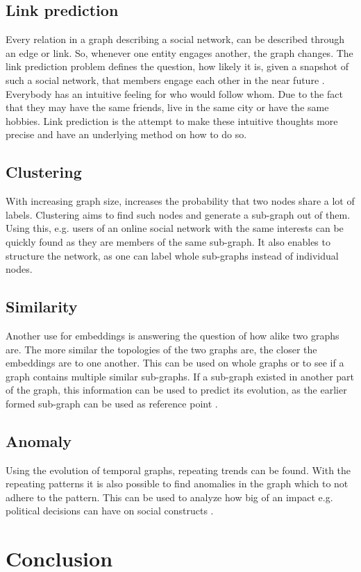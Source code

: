 \documentclass[sigconf]{acmart}
\begin{document}
\subsection{Link prediction}
Every relation in a graph describing a social network, can be described  through an edge or link. So, whenever one entity engages another, the graph changes.
The link prediction problem defines the question, how likely it is, given a snapshot of such a social network, that members engage each other in the near future \cite{LibenNowell.op.2003}.
Everybody has an intuitive feeling for who would follow whom. Due to the fact that they may have the same friends, live in the same city or have the same hobbies. 
Link prediction is the attempt to make these intuitive thoughts more precise and have an underlying method on how to do so.

\subsection{Clustering}
With increasing graph size, increases the probability that two nodes share a lot of labels. 
Clustering aims to find such nodes and generate a sub-graph out of them. Using this, e.g. users of an online social network with the same interests can be quickly found as they are members of the same sub-graph.
It also enables to structure the network, as one can label whole sub-graphs instead of individual nodes. \cite{Ding.2001}

\subsection{Similarity}
Another use for embeddings is answering the question of how alike two graphs are. The more similar the topologies of the two graphs are, the closer the embeddings are to one another. This can be used on whole graphs or to see if a graph
contains multiple similar sub-graphs. If a sub-graph existed in another part of the graph, this information can be used to predict its evolution, as the earlier formed sub-graph can be used as reference point \cite{Beladev.2020}.

\subsection{Anomaly}
Using the evolution of temporal graphs, repeating trends can be found. With the repeating patterns it is also possible to find anomalies in the graph which to not adhere to the pattern.
This can be used to analyze how big of an impact e.g. political decisions can have on social constructs \cite{Beladev.2020}.


\section{Conclusion}




\end{document}
